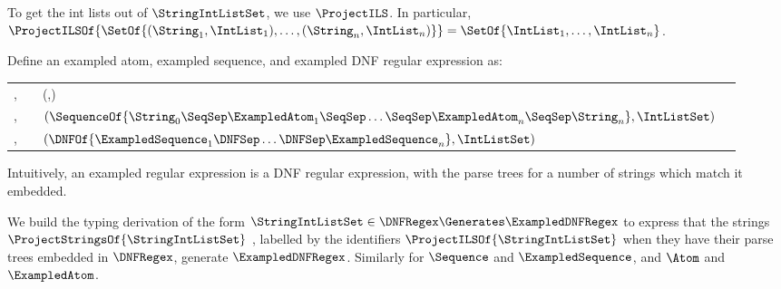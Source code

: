 \documentclass[sigplan,acmsmall]{acmart}
\begin{document}
\begin{definition}
  To get the int lists out of $\StringIntListSet$, we use $\ProjectILS$.  In
  particular,\\
  $\ProjectILSOf{\SetOf{(\String_1,\IntList_1),\ldots,(\String_n,\IntList_n)}}
  = \SetOf{\IntList_1,\ldots,\IntList_n}$.
\end{definition}

\begin{definition}
  Define an exampled atom, exampled sequence, and exampled DNF regular expression as:
  \begin{center}
    \begin{tabular}{l@{\ }c@{\ }l@{\ }>{\itshape\/}r}
      \ExampledAtom{},\ExampledAtomAlt{} & \GEq{} & (\StarOf{\ExampledDNFRegex{}},\IntListSet{})
      \\
      \ExampledSequence{},\ExampledSequenceAlt{} & \GEq{} &
                                                            $(\SequenceOf{\String_0\SeqSep\ExampledAtom_1\SeqSep\ldots\SeqSep\ExampledAtom_n\SeqSep\String_n},\IntListSet)$
      \\
      \ExampledDNFRegex{},\ExampledDNFRegexAlt{} & \GEq{} &
                                                            $(\DNFOf{\ExampledSequence_1\DNFSep\ldots\DNFSep\ExampledSequence_n},\IntListSet)$ %
    \end{tabular}
  \end{center}
\end{definition}

Intuitively, an exampled regular expression is a DNF regular expression, with the
parse trees for a number of strings which match it embedded.

We build the
typing derivation of the form
$\StringIntListSet \in \DNFRegex
\Generates \ExampledDNFRegex$ to express that the strings
$\ProjectStringsOf{\StringIntListSet}$
, labelled by the identifiers
$\ProjectILSOf{\StringIntListSet}$ when they have their parse trees embedded in
$\DNFRegex$, generate $\ExampledDNFRegex$.
Similarly for $\Sequence$ and $\ExampledSequence$, and $\Atom$ and
$\ExampledAtom$.
\end{document}
